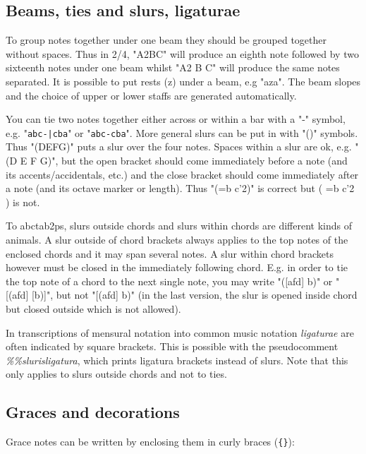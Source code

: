 \documentclass[a4paper]{article}
\begin{document}
\subsection{Beams, ties and slurs, ligaturae}
To group notes together under one beam  they  should  be  grouped
together without spaces. Thus in 2/4, "A2BC" will produce an eighth
note followed by two sixteenth notes under one beam whilst "A2 B C"
will  produce  the  same notes separated. It is possible to put 
rests (z) under a beam, e.g "aza". The beam slopes and the
choice of upper or lower staffs are generated automatically.
\par
{} 
You can tie two notes together either across or within a bar with
a  "-" symbol, e.g. "\verb$abc-|cba$" or "\verb$abc-cba$". 
More general slurs can be put in with "()" symbols.  Thus "(DEFG)" 
puts a slur  over  the  four notes.  Spaces within a slur are ok, e.g. 
"(D E F G)", but the open bracket  should  come  immediately  
before a note (and its accents/accidentals,  etc.)  and  the  close  
bracket should come immediately after a note (and its octave 
marker or length).  Thus "(=b c'2)" is correct but ( =b c'2 ) is not.
\par
To abctab2ps, slurs outside chords and slurs within chords are 
different kinds of animals. A slur outside of chord brackets always
applies to the top notes of the enclosed chords and it may span
several notes. A slur within chord brackets however must be 
closed in the immediately following chord. E.g. in order to
tie the top note of a chord to the next single note, you may write
"([afd] b)" or "[(afd] [b)]", but not "[(afd] b)" (in the last
version, the slur is opened inside chord but closed outside which
is not allowed).
\par
{}
In transcriptions of mensural notation into common music notation
{\it ligaturae} are often indicated by square brackets. This is possible
with the pseudocomment {\it \%\%slurisligatura}, which prints ligatura
brackets instead of slurs. Note that this only applies to slurs outside
chords and not to ties.

\subsection{Graces and decorations}
   
  
   
Grace notes can be written by enclosing them in curly braces (\verb${}$):
\end{document}
